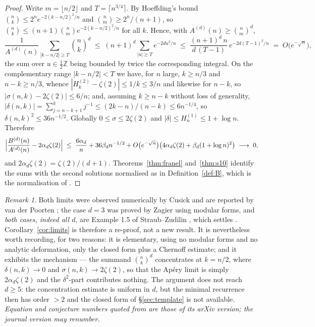 \documentclass[11pt,reqno]{amsart}
\theoremstyle{plain}
\theoremstyle{definition}
\theoremstyle{remark}
\newtheorem{remark}[theorem]{Remark}
\newcommand{\Z}{\mathbb{Z}}
\newcommand{\bin}[2]{\binom{#1}{#2}}
\newcommand{\HH}[2]{H^{(#1)}_{#2}}
\numberwithin{equation}{section}
\begin{document}
\begin{proof}
Write $m=\lfloor n/2\rfloor$ and $T=\lceil n^{3/4}\rceil$. By Hoeffding's bound
$\bin nk\le2^ne^{-2(k-n/2)^2/n}$ and $\bin nm\ge2^n/(n+1)$, so
$\bin nk\le(n+1)\bin nme^{-2(k-n/2)^2/n}$ for all $k$. Hence, with
$A^{(d)}(n)\ge\bin nm^d$,
\[
  \frac1{A^{(d)}(n)}\sum_{|k-n/2|\ge T}\bin nk^d
  \;\le\;(n+1)^d\!\!\sum_{|u|\ge T}\!e^{-2du^2/n}
  \;\le\;\frac{(n+1)^d\,n}{d\,(T-1)}\,e^{-2d(T-1)^2/n}
  \;=\;O\bigl(e^{-\sqrt n}\bigr),
\]
the sum over $u\in\tfrac12\Z$ being bounded by twice the corresponding integral. On the
complementary range $|k-n/2|<T$ we have, for $n$ large, $k\ge n/3$ and $n-k\ge n/3$, whence
$|\HH2k-\zeta(2)|\le1/k\le3/n$ and likewise for $n-k$, so $|\sigma(n,k)-2\zeta(2)|\le6/n$;
and, assuming $k\ge n-k$ without loss of generality,
$|\delta(n,k)|=\sum_{j=n-k+1}^{k}j^{-1}\le(2k-n)/(n-k)\le 6n^{-1/4}$, so
$\delta(n,k)^2\le36n^{-1/2}$. Globally $0\le\sigma\le2\zeta(2)$ and
$|\delta|\le\HH1n\le1+\log n$. Therefore
\[
  \Bigl|\frac{B^{(d)}(n)}{A^{(d)}(n)}-2\alpha_d\zeta(2)\Bigr|
  \;\le\;\frac{6\alpha_d}{n}+36\beta_d n^{-1/2}
       +O\bigl(e^{-\sqrt n}\bigr)\bigl(4\alpha_d\zeta(2)+\beta_d(1+\log n)^2\bigr)
  \;\longrightarrow\;0 ,
\]
and $2\alpha_d\zeta(2)=\zeta(2)/(d+1)$. Theorems~\ref{thm:franel} and~\ref{thm:s10} identify
the sums with the second solutions normalised as in Definition~\ref{def:B}, which is the
normalisation of \cite[eq.~(20)]{ChamStraub}.
\end{proof}

\begin{remark}
Both limits were observed numerically by Cusick and are reported by van der Poorten
\cite[p.~202]{vdPoorten1979}; the case $d=3$ was proved by Zagier \cite{Zagier2009} using
modular forms, and \emph{both cases, indeed all $d$}, are Example 1.5 of Straub--Zudilin
\cite{StraubZudilin}, which settles \cite[Conj.~9]{ChamStraub}. Corollary~\ref{cor:limits}
is therefore a re-proof, not a new result. It is nevertheless worth recording, for two
reasons: it is elementary, using no modular forms and no analytic deformation, only the
closed form plus a Chernoff estimate; and it exhibits the mechanism --- the summand
$\bin nk^d$ concentrates at $k=n/2$, where $\delta(n,k)\to0$ and $\sigma(n,k)\to2\zeta(2)$,
so that the Ap\'ery limit is simply $2\alpha_d\zeta(2)$ and the $\delta^2$-part contributes
nothing. The argument does not reach $d\ge5$: the concentration estimate is uniform in $d$,
but the minimal recurrence then has order $>2$ and the closed form of
\S\ref{sec:template} is not available. \emph{Equation and conjecture numbers quoted from
\cite{ChamStraub} are those of its arXiv version; the journal version may renumber.}
\end{remark}
\end{document}
